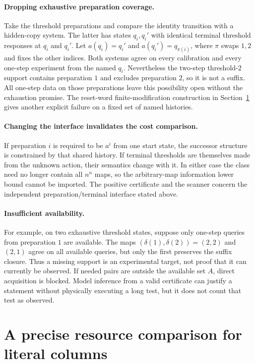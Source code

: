\documentclass[11pt]{article}
\theoremstyle{remark}
\begin{document}
\paragraph{Dropping exhaustive preparation coverage.}
Take the threshold preparations and compare the identity transition with a hidden-copy system. The latter has states $q_i,q_i'$ with identical terminal threshold responses at $q_i$ and $q_i'$. Let $a(q_i)=q_i'$ and $a(q_i')=q_{\pi(i)}$, where $\pi$ swaps $1,2$ and fixes the other indices. Both systems agree on every calibration and every one-step experiment from the named $q_i$. Nevertheless the two-step threshold-$2$ support contains preparation $1$ and excludes preparation $2$, so it is not a suffix. All one-step data on those preparations leave this possibility open without the exhaustion promise. The reset-word finite-modification construction in Section~\ref{sec:resource} gives another explicit failure on a fixed set of named histories.

\paragraph{Changing the interface invalidates the cost comparison.}
If preparation $i$ is required to be $a^i$ from one start state, the successor structure is constrained by that shared history. If terminal thresholds are themselves made from the unknown action, their semantics change with it. In either case the class need no longer contain all $n^n$ maps, so the arbitrary-map information lower bound cannot be imported. The positive certificate and the scanner concern the independent preparation/terminal interface stated above.

\paragraph{Insufficient availability.}
For example, on two exhaustive threshold states, suppose only one-step queries from preparation $1$ are available. The maps $(\delta(1),\delta(2))=(2,2)$ and $(2,1)$ agree on all available queries, but only the first preserves the suffix closure. Thus a missing support is an experimental target, not proof that it can currently be observed. If needed pairs are outside the available set $A$, direct acquisition is blocked. Model inference from a valid certificate can justify a statement without physically executing a long test, but it does not count that test as observed.

\section{A precise resource comparison for literal columns}
\label{sec:resource}
\end{document}

